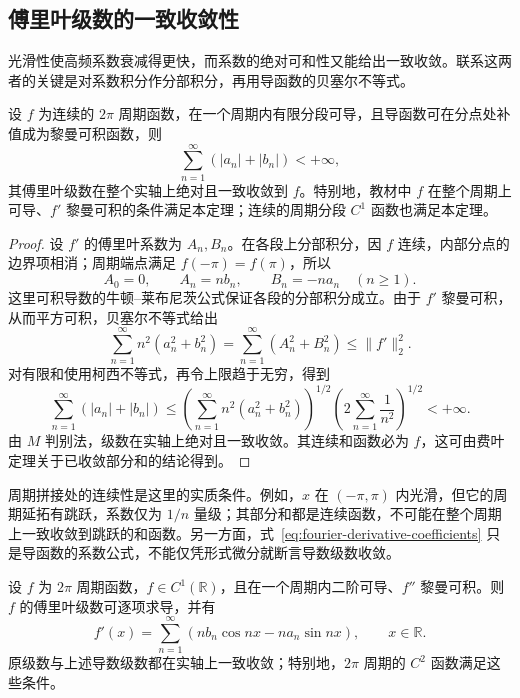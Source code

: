 \subsection{傅里叶级数的一致收敛性}
\label{subsec:uniform-convergence-of-fourier-series}

光滑性使高频系数衰减得更快，而系数的绝对可和性又能给出一致收敛。联系这两者的关键是对系数积分作分部积分，再用导函数的贝塞尔不等式。

\begin{theorem}[一个一致收敛的充分条件]
\label{thm:fourier-absolute-uniform-convergence}
设 $f$ 为连续的 $2\pi$ 周期函数，在一个周期内有限分段可导，且导函数可在分点处补值成为黎曼可积函数，则
\begin{equation}
    \sum_{n=1}^\infty(|a_n|+|b_n|)<+\infty,
    \label{eq:fourier-absolute-coefficient-summability}
\end{equation}
其傅里叶级数在整个实轴上绝对且一致收敛到 $f$。特别地，教材中 $f$ 在整个周期上可导、$f'$ 黎曼可积的条件满足本定理；连续的周期分段 $C^1$ 函数也满足本定理。
\end{theorem}

\begin{proof}
设 $f'$ 的傅里叶系数为 $A_n,B_n$。在各段上分部积分，因 $f$ 连续，内部分点的边界项相消；周期端点满足 $f(-\pi)=f(\pi)$，所以
\begin{equation}
    A_0=0,\qquad A_n=nb_n,\qquad B_n=-na_n\quad(n\geq1).
    \label{eq:fourier-derivative-coefficients}
\end{equation}
这里可积导数的牛顿--莱布尼茨公式保证各段的分部积分成立。由于 $f'$ 黎曼可积，从而平方可积，贝塞尔不等式给出
\[
    \sum_{n=1}^\infty n^2(a_n^2+b_n^2)
       =\sum_{n=1}^\infty(A_n^2+B_n^2)\leq\|f'\|_2^2.
\]
对有限和使用柯西不等式，再令上限趋于无穷，得到
\[
    \sum_{n=1}^\infty(|a_n|+|b_n|)
       \leq\left(\sum_{n=1}^\infty n^2(a_n^2+b_n^2)\right)^{1/2}
          \left(2\sum_{n=1}^\infty\frac1{n^2}\right)^{1/2}<+\infty.
\]
由 $M$ 判别法，级数在实轴上绝对且一致收敛。其连续和函数必为 $f$，这可由费叶定理关于已收敛部分和的结论得到。
\end{proof}

周期拼接处的连续性是这里的实质条件。例如，$x$ 在 $(-\pi,\pi)$ 内光滑，但它的周期延拓有跳跃，系数仅为 $1/n$ 量级；其部分和都是连续函数，不可能在整个周期上一致收敛到跳跃的和函数。另一方面，式~\eqref{eq:fourier-derivative-coefficients} 只是导函数的系数公式，不能仅凭形式微分就断言导数级数收敛。

\begin{theorem}[傅里叶级数的逐项求导]
\label{thm:fourier-termwise-differentiation}
设 $f$ 为 $2\pi$ 周期函数，$f\in C^1(\mathbb R)$，且在一个周期内二阶可导、$f''$ 黎曼可积。则 $f$ 的傅里叶级数可逐项求导，并有
\begin{equation}
    f'(x)=\sum_{n=1}^\infty
                       (nb_n\cos nx-na_n\sin nx),
    \qquad x\in\mathbb R.
    \label{eq:fourier-termwise-differentiation}
\end{equation}
原级数与上述导数级数都在实轴上一致收敛；特别地，$2\pi$ 周期的 $C^2$ 函数满足这些条件。
\end{theorem}

